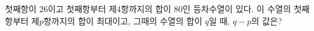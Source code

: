 첫째항이 $26$이고 첫째항부터 제$4$항까지의 합이 $80$인 등차수열이 있다. 이 수열의 첫째항부터 제$p$항까지의 합이 최대이고, 그때의 수열의 합이 $q$일 때, $q-p$의 값은?
